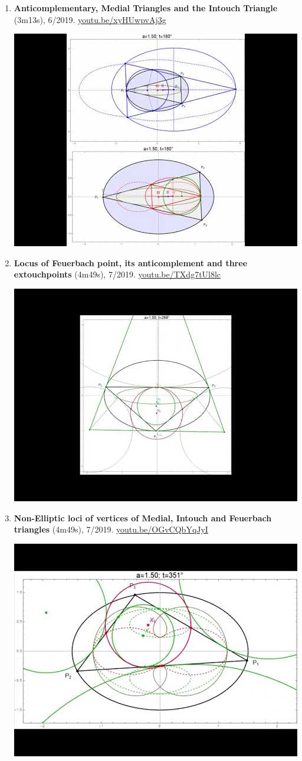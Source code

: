 \documentclass[12pt]{article}
\begin{document}
\begin{enumerate}[resume]
% 
\item \textbf{Anticomplementary, Medial Triangles and the Intouch Triangle} (3m13s), 6/2019. \href{https://youtu.be/xyHUwpvAj3g}{\url{youtu.be/xyHUwpvAj3g}}
\begin{center}\includegraphics[width=.5\textwidth]{pics/xyHUwpvAj3g.jpg}\end{center}
% 
\item \textbf{Locus of Feuerbach point, its anticomplement and three extouchpoints} (4m49s), 7/2019. \href{https://youtu.be/TXdg7tUl8lc}{\url{youtu.be/TXdg7tUl8lc}}
\begin{center}\includegraphics[width=.5\textwidth]{pics/TXdg7tUl8lc.jpg}\end{center}
% 
\item \textbf{Non-Elliptic loci of vertices of Medial, Intouch and Feuerbach triangles} (4m49s), 7/2019. \href{https://youtu.be/OGvCQbYqJyI}{\url{youtu.be/OGvCQbYqJyI}}
\begin{center}\includegraphics[width=.5\textwidth]{pics/OGvCQbYqJyI.jpg}\end{center}

\end{enumerate}
\end{document}
